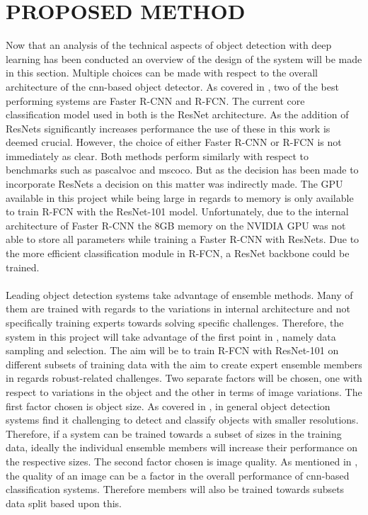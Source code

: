 \documentclass[a4paper,twoside]{article}
\begin{document}
\section{\uppercase{Proposed Method}}
Now that an analysis of the technical aspects of object detection with deep learning has been conducted an overview of the design of the system will be made in this section. 
Multiple choices can be made with respect to the overall architecture of the \gls{cnn}-based object detector. As covered in , two of the best performing systems are Faster R-CNN and R-FCN. The current core classification model used in both is the ResNet architecture. As the addition of ResNets significantly increases performance the use of these in this work is deemed crucial. However, the choice of either Faster R-CNN or R-FCN is not immediately as clear. Both methods perform similarly with respect to benchmarks such as \gls{pascalvoc} and \gls{mscoco}. But as the decision has been made to incorporate ResNets a decision on this matter was indirectly made. The GPU available in this project while being large in regards to memory is only available to train R-FCN with the ResNet-101 model. Unfortunately, due to the internal architecture of Faster R-CNN the 8GB memory on the NVIDIA GPU was not able to store all parameters while training a Faster R-CNN with ResNets. Due to the more efficient classification module in R-FCN, a ResNet backbone could be trained.
\\\\
Leading object detection systems take advantage of ensemble methods. Many of them are trained with regards to the variations in internal architecture and not specifically training experts towards solving specific challenges. Therefore, the system in this project will take advantage of the first point in , namely data sampling and selection. The aim will be to train R-FCN with ResNet-101 on different subsets of training data with the aim to create expert ensemble members in regards robust-related challenges. Two separate factors will be chosen, one with respect to variations in the object and the other in terms of image variations. The first factor chosen is object size. As covered in , in general object detection systems find it challenging to detect and classify objects with smaller resolutions. Therefore, if a system can be trained towards a subset of sizes in the training data, ideally the individual ensemble members will increase their performance on the respective sizes. The second factor chosen is image quality. As mentioned in , the quality of an image can be a factor in the overall performance of \gls{cnn}-based classification systems. Therefore members will also be trained towards subsets data split based upon this.
\end{document}
